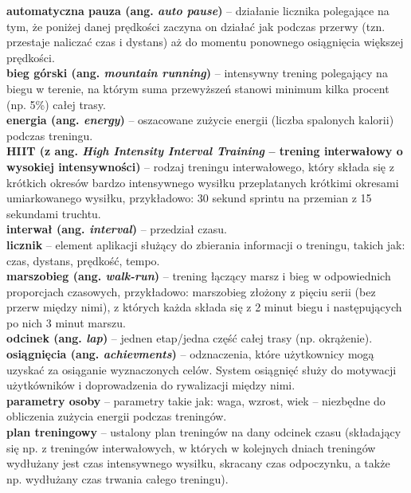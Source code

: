

\newcommand{\dicen}[1]{
  \indent\textbf{#1}
}


	\noindent\dicen{automatyczna pauza (ang. \textit{auto pause})}-- działanie licznika polegające na tym, że poniżej danej prędkości zaczyna on działać jak podczas przerwy (tzn. przestaje naliczać czas i dystans) aż do momentu ponownego osiągnięcia większej prędkości.\\
	\dicen{bieg górski (ang. \textit{mountain running})}-- intensywny trening polegający na biegu w terenie, na którym suma przewyższeń stanowi minimum kilka procent (np. 5\%) całej trasy.\\
	\dicen{energia (ang. \textit{energy})}-- oszacowane zużycie energii (liczba spalonych kalorii) podczas treningu.\\
	\dicen{HIIT (z ang. \textit{High Intensity Interval Training} -- trening interwałowy o wysokiej intensywności)}-- rodzaj treningu interwałowego, który składa się z krótkich okresów bardzo intensywnego wysiłku przeplatanych krótkimi okresami umiarkowanego wysiłku, przykładowo: 30 sekund sprintu na przemian z 15 sekundami truchtu.\\
	\dicen{interwał (ang. \textit{interval})}-- przedział czasu.\\
	\dicen{licznik}-- element aplikacji służący do zbierania informacji o treningu, takich jak: czas, dystans, prędkość, tempo.\\
	\dicen{marszobieg (ang. \textit{walk-run})}-- trening łączący marsz i bieg w odpowiednich proporcjach czasowych, przykładowo: marszobieg złożony z pięciu serii (bez przerw między nimi), z których każda składa się z 2 minut biegu i następujących po nich 3 minut marszu.\\
	\dicen{odcinek (ang. \textit{lap})}-- jednen etap/jedna część całej trasy (np. okrążenie).\\
	\dicen{osiągnięcia (ang. \textit{achievments})}-- odznaczenia, które użytkownicy mogą uzyskać za osiąganie wyznaczonych celów. System osiągnięć służy do motywacji użytkówników i doprowadzenia do rywalizacji między nimi.\\
	\dicen{parametry osoby}-- parametry takie jak: waga, wzrost, wiek -- niezbędne do obliczenia zużycia energii podczas treningów.\\
	\dicen{plan treningowy}-- ustalony plan treningów na dany odcinek czasu (składający się np. z treningów interwałowych, w których w kolejnych dniach treningów wydłużany jest czas intensywnego wysiłku, skracany czas odpoczynku, a także np. wydłużany czas trwania całego treningu).\\
